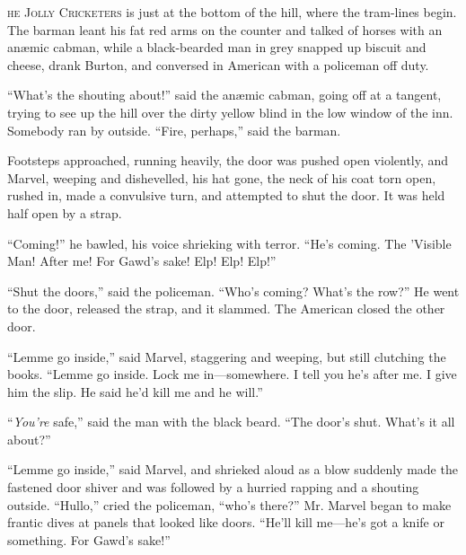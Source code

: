 \label{ch:16}
\begin{ChapterStart}
\vspace*{2\nbs}

\vspace{1.5\nbs}
\vspace{0.75\nbs}
\end{ChapterStart}

\kern-3pt\textsc{he Jolly Cricketers} is just at the bottom of the hill, where the tram-lines begin. The barman leant his fat red arms on the counter and talked of horses with an anæmic cabman, while a black-bearded man in grey snapped up biscuit and cheese, drank Burton, and conversed in American with a policeman off duty.

“What’s the shouting about!” said the anæmic cabman, going off at a tangent, trying to see up the hill over the dirty yellow blind in the low window of the inn. Somebody ran by outside. “Fire, perhaps,” said the barman.

Footsteps approached, running heavily, the door was pushed open violently, and Marvel, weeping and dishevelled, his hat gone, the neck of his coat torn open, rushed in, made a convulsive turn, and attempted to shut the door. It was held half open by a strap.

“Coming!” he bawled, his voice shrieking with terror. “He’s coming. The ’Visible Man! After me! For Gawd’s sake! Elp! Elp! Elp!”

“Shut the doors,” said the policeman. “Who’s coming? What’s the row?” He went to the door, released the strap, and it slammed. The American closed the other door.

“Lemme go inside,” said Marvel, staggering and weeping, but still clutching the books. “Lemme go inside. Lock me in—somewhere. I tell you he’s after me. I give him the slip. He said he’d kill me and he will.”

“\kern-1pt\emph{You’re} safe,” said the man with the black beard. “The door’s shut. What’s it all about?”

“Lemme go inside,” said Marvel, and shrieked aloud as a blow suddenly made the fastened door shiver and was followed by a hurried rapping and a shouting outside. “Hullo,” cried the policeman, “who’s there?” Mr. Marvel began to make frantic dives at panels that looked like doors. “He’ll kill me—he’s got a knife or something. For Gawd’s sake!”

